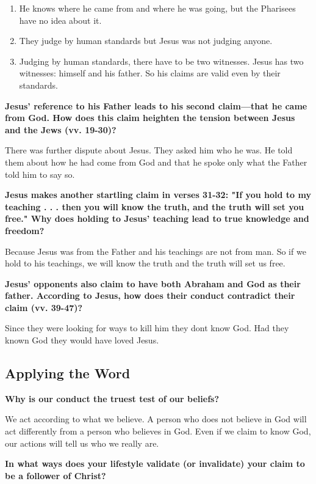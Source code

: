 \documentclass[11pt]{article}
\begin{document}
\begin{enumerate}
\item He knows where he came from and where he was going, but the Pharisees have no idea about it.

\item They judge by human standards but Jesus was not judging anyone.

\item Judging by human standards, there have to be two witnesses. Jesus has two witnesses: himself and his father. So his claims are valid even by their standards.
\end{enumerate}


\textbf{\textbf{Jesus' reference to his Father leads to his second claim—that he came from God. How does this claim heighten the tension between Jesus and the Jews (vv. 19-30)?}}

There was further dispute about Jesus. They asked him who he was. He told them about how he had come from God and that he spoke only what the Father told him to say so.

\textbf{\textbf{Jesus makes another startling claim in verses 31-32: "If you hold to my teaching . . . then you will know the truth, and the truth will set you free." Why does holding to Jesus’ teaching lead to true knowledge and freedom?}}

Because Jesus was from the Father and his teachings are not from man. So if we hold to his teachings, we will know the truth and the truth will set us free.

\textbf{\textbf{Jesus' opponents also claim to have both Abraham and God as their father. According to Jesus, how does their conduct contradict their claim (vv. 39-47)?}}

Since they were looking for ways to kill him they dont know God. Had they known God they would have loved Jesus.


\subsection{Applying the Word}
\label{sec:orgce78a36}

\textbf{\textbf{Why is our conduct the truest test of our beliefs?}}

We act according to what we believe. A person who does not believe in God will act differently from a person who believes in God. Even if we claim to know God, our actions will tell us who we really are.

\textbf{\textbf{In what ways does your lifestyle validate (or invalidate) your claim to be a follower of Christ?}}
\end{document}
